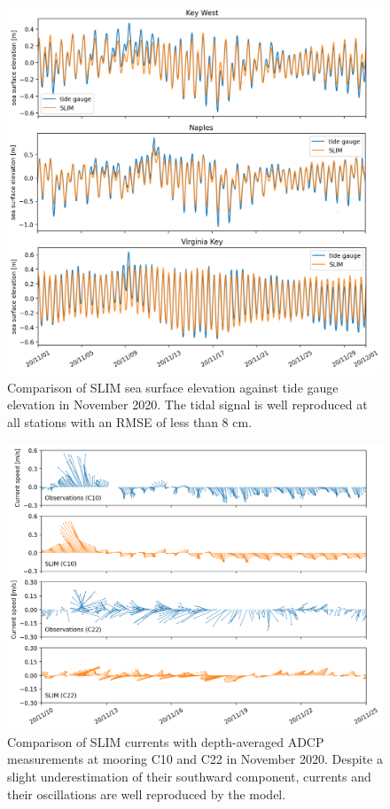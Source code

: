 \begin{subappendices}
	\begin{figure}
		\centering
		\includegraphics[width=\textwidth]{chapters/drto/figures/a2.png}
		\caption{Comparison of SLIM sea surface elevation against tide gauge elevation in November 2020. The tidal signal is well reproduced at all stations with an RMSE of less than 8 cm.}
		\label{fig:a2}
	\end{figure}

	\begin{figure}
		\centering
		\includegraphics[width=\textwidth]{chapters/drto/figures/a3.png}
		\caption{Comparison of SLIM currents with depth-averaged ADCP measurements at mooring C10 and C22 in November 2020. Despite a slight underestimation of their southward component, currents and their oscillations are well reproduced by the model.}
		\label{fig:a3}
	\end{figure}
		

\end{subappendices}
